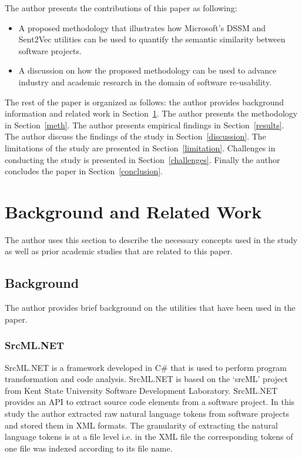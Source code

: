 \documentclass[conference]{IEEEtran}
\begin{document}
The author presents the contributions of this paper as following: 
\begin{itemize}
\item{A proposed methodology that illustrates how Microsoft's DSSM and Sent2Vec utilities can be used to quantify the semantic similarity between software projects.}
\item{A discussion on how the proposed methodology can be used to advance industry and academic research in the domain of software re-usability.}
\end{itemize}    

The rest of the paper is organized as follows: the author provides background information and related work in Section~\ref{related}. The author presents the methodology in Section~\ref{meth}. The author presents empirical findings in Section~\ref{results}. The author discuss the findings of the study in Section~\ref{discussion}. The limitations of the study are presented in Section~\ref{limitation}. Challenges in conducting the study is presented in Section~\ref{challenges}. Finally the author concludes the paper in Section~\ref{conclusion}.






\section{Background and Related Work}
\label{related}
The author uses this section to describe the necessary concepts used in the study as well as prior academic studies that are related to this paper.
\subsection{Background}
The author provides brief background on the utilities that have been used in the paper. 
\subsubsection{SrcML.NET}
SrcML.NET is a framework developed in C\# that is used to perform program transformation and code analysis. SrcML.NET is based on the `srcML' project from Kent State University Software Development Laboratory. SrcML.NET provides an API to extract source code elements from a software project. In this study the author extracted raw natural language tokens from software projects and stored them in XML formats. The granularity of extracting the natural language tokens is at a file level i.e. in the XML file the corresponding tokens of one file was indexed according to its file name.    
\end{document}

